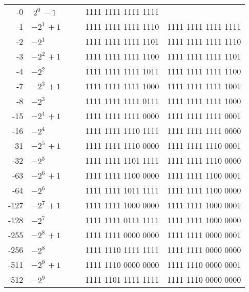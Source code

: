 \documentclass[a4paper,10pt]{article}
\begin{document}
\begin{center}
\begin{tabular}{rlrrrr}
       -0 &$ ~2^{0~} - 1 $&                     &      & 1111 1111 1111 1111 &                     \\
       -1 &$ -2^{1~} + 1 $&                     &      & 1111 1111 1111 1110 & 1111 1111 1111 1111 \\
       -2 &$ -2^{1~}     $&                     &      & 1111 1111 1111 1101 & 1111 1111 1111 1110 \\
       -3 &$ -2^{2~} + 1 $&                     &      & 1111 1111 1111 1100 & 1111 1111 1111 1101 \\
       -4 &$ -2^{2~}     $&                     &      & 1111 1111 1111 1011 & 1111 1111 1111 1100 \\
       -7 &$ -2^{3~} + 1 $&                     &      & 1111 1111 1111 1000 & 1111 1111 1111 1001 \\
       -8 &$ -2^{3~}     $&                     &      & 1111 1111 1111 0111 & 1111 1111 1111 1000 \\
      -15 &$ -2^{4~} + 1 $&                     &      & 1111 1111 1111 0000 & 1111 1111 1111 0001 \\
      -16 &$ -2^{4~}     $&                     &      & 1111 1111 1110 1111 & 1111 1111 1111 0000 \\
      -31 &$ -2^{5~} + 1 $&                     &      & 1111 1111 1110 0000 & 1111 1111 1110 0001 \\
      -32 &$ -2^{5~}     $&                     &      & 1111 1111 1101 1111 & 1111 1111 1110 0000 \\
      -63 &$ -2^{6~} + 1 $&                     &      & 1111 1111 1100 0000 & 1111 1111 1100 0001 \\
      -64 &$ -2^{6~}     $&                     &      & 1111 1111 1011 1111 & 1111 1111 1100 0000 \\
     -127 &$ -2^{7~} + 1 $&                     &      & 1111 1111 1000 0000 & 1111 1111 1000 0001 \\
     -128 &$ -2^{7~}     $&                     &      & 1111 1111 0111 1111 & 1111 1111 1000 0000 \\
     -255 &$ -2^{8~} + 1 $&                     &      & 1111 1111 0000 0000 & 1111 1111 0000 0001 \\
     -256 &$ -2^{8~}     $&                     &      & 1111 1110 1111 1111 & 1111 1111 0000 0000 \\
     -511 &$ -2^{9~} + 1 $&                     &      & 1111 1110 0000 0000 & 1111 1110 0000 0001 \\
     -512 &$ -2^{9~}     $&                     &      & 1111 1101 1111 1111 & 1111 1110 0000 0000 \\

\end{tabular}
\end{center}
\end{document}
